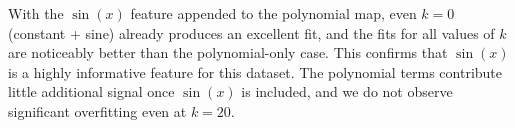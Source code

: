 \begin{answer}
With the $\sin(x)$ feature appended to the polynomial map, even $k=0$ (constant + sine) already produces an excellent fit, and the fits for all values of $k$ are noticeably better than the polynomial-only case. This confirms that $\sin(x)$ is a highly informative feature for this dataset. The polynomial terms contribute little additional signal once $\sin(x)$ is included, and we do not observe significant overfitting even at $k=20$.
\end{answer}

